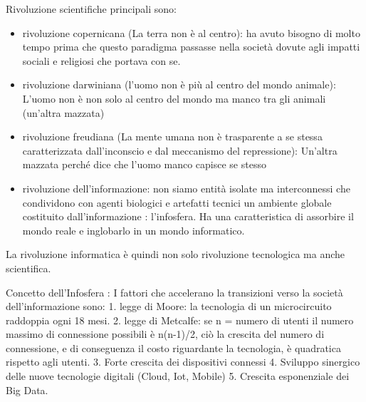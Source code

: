 \documentclass[11pt, a4page, twocolumn]{article}
\begin{document}
Rivoluzione scientifiche principali sono:
\begin{itemize}
    \item rivoluzione copernicana (La terra non è al centro): ha avuto bisogno di molto tempo prima che questo paradigma passasse nella società dovute agli impatti sociali e religiosi che portava con se.
    \item rivoluzione darwiniana (l’uomo non è più al centro del mondo animale): L’uomo non è non solo al centro del mondo ma manco tra gli animali (un’altra mazzata)
    \item rivoluzione freudiana (La mente umana non è trasparente a se stessa caratterizzata dall’inconscio e dal meccanismo del repressione): Un’altra mazzata perché dice che l’uomo manco capisce se stesso
    \item rivoluzione dell’informazione: non siamo entità isolate ma interconnessi che condividono con agenti biologici e artefatti tecnici un ambiente globale costituito dall’informazione : l’infosfera. Ha una caratteristica di assorbire il mondo reale e inglobarlo in un mondo informatico.
\end{itemize}

La rivoluzione informatica è quindi non solo rivoluzione tecnologica ma anche scientifica.

Concetto dell’Infosfera : 
I fattori che accelerano la transizioni verso la società dell’informazione sono:
    1. legge di Moore: la tecnologia di un microcircuito raddoppia ogni 18 mesi.
    2. legge di Metcalfe: se n = numero di utenti il numero massimo di connessione possibili è  n(n-1)/2, ciò la crescita del numero di connessione, e di conseguenza il costo riguardante la tecnologia, è quadratica rispetto agli utenti.
    3. Forte crescita dei dispositivi connessi
    4. Sviluppo sinergico delle nuove tecnologie digitali (Cloud, Iot, Mobile)
    5. Crescita esponenziale dei Big Data.
\end{document}

